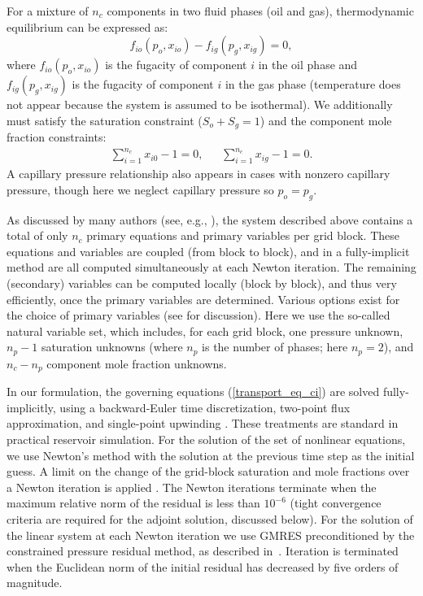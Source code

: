 For a mixture of $n_c$ components in two fluid phases (oil and gas), thermodynamic equilibrium
can be expressed as:
%
\begin{equation} \label{general_therm_system1} f_{io}(p_o, x_{io}) - f_{ig}(p_g,
  x_{ig}) = 0,  \end{equation}
%
where $f_{io}(p_o, x_{io})$ is the fugacity of component $i$ in the oil phase and $f_{ig}(p_g, x_{ig})$ 
is the fugacity of component $i$ in the gas phase (temperature does not appear because the system is assumed to
be isothermal).
We additionally must satisfy the saturation constraint ($S_o+S_g=1$) and the
component mole fraction constraints:
%
\begin{align}\label{eqn:MoleFractionCons} \sum_{i=1}^{n_c} x_{i0} -1 = 0, \ \ \
    \ \ \ \ \sum_{i=1}^{n_c} x_{ig} -1 = 0.  \end{align}
%
A capillary pressure relationship also appears in cases with nonzero capillary
pressure, though here we neglect capillary pressure so $p_o=p_g$.

As discussed by many authors (see, e.g.,
\cite{Coats:1980,Cao:Thesis,Voskov:2012,Young:1983}), the system described
above contains a total of only $n_c$ primary equations and primary variables per
grid block. These equations and variables are coupled (from block to block), and
in a fully-implicit method are all computed simultaneously at each Newton
iteration. The remaining (secondary) variables can be computed locally (block by
block), and thus very efficiently, once the primary variables are determined.
Various options exist for the choice of primary variables (see
\cite{Voskov:2012} for discussion). Here we use the so-called natural variable
set, which includes, for each grid block, one pressure unknown, $n_p-1$
saturation unknowns (where $n_p$ is the number of phases; here $n_p=2$), and $n_c-n_p$ component mole fraction unknowns.

In our formulation, the governing equations (\ref{transport_eq_ci}) are solved
fully-implicitly, using a backward-Euler time discretization, two-point flux
approximation, and single-point upwinding \cite{Aziz_book79}. These treatments
are standard in practical reservoir simulation. For the solution of the set of
nonlinear equations, we use Newton's method with the solution at the previous
time step as the initial guess. A limit on the change of the grid-block
saturation and mole fractions over a Newton iteration is applied
\cite{Younis:2010}. The Newton iterations terminate when the maximum relative
norm of the residual is less than $10^{-6}$ (tight convergence criteria are required for the adjoint solution, discussed below). For the solution of the
linear system at each Newton iteration we use GMRES preconditioned by the
constrained pressure residual method, as described in~\cite{CPRA}. Iteration is
terminated when the Euclidean norm of the initial residual has decreased by five
orders of magnitude.

